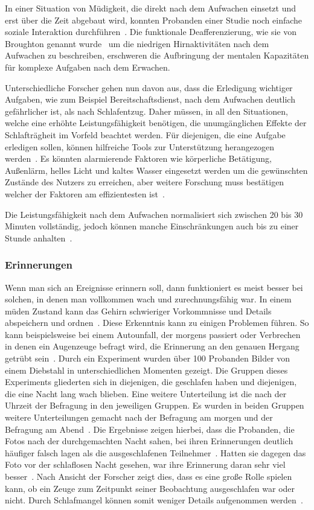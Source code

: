 In einer Situation von Müdigkeit, die direkt nach dem Aufwachen einsetzt und erst über die Zeit abgebaut wird, konnten Probanden einer Studie noch einfache soziale Interaktion durchführen~\cite{dinges1990you}. 
Die funktionale Deafferenzierung, wie sie von Broughton genannt wurde~\cite{broughton1968sleep} um die niedrigen Hirnaktivitäten nach dem Aufwachen zu beschreiben, erschweren die Aufbringung der mentalen Kapazitäten für komplexe Aufgaben nach dem Erwachen.

Unterschiedliche Forscher gehen nun davon aus, dass die Erledigung wichtiger Aufgaben, wie zum Beispiel Bereitschaftsdienst, nach dem Aufwachen deutlich gefährlicher ist, als nach Schlafentzug.
Daher müssen, in all den Situationen, welche eine erhöhte Leistungsfähigkeit benötigen, die unumgänglichen Effekte der Schlafträgheit im Vorfeld beachtet werden. 
Für diejenigen, die eine Aufgabe erledigen sollen, können hilfreiche Tools zur Unterstützung herangezogen werden~\cite{ferrara2000sleep}. 
Es könnten alarmierende Faktoren wie körperliche Betätigung, Außenlärm, helles Licht und kaltes Wasser eingesetzt werden um die gewünschten Zustände des Nutzers zu erreichen, aber weitere Forschung muss bestätigen welcher der Faktoren am effizientesten ist~\cite{ferrara2000sleep}.

Die Leistungsfähigkeit nach dem Aufwachen normalisiert sich zwischen 20 bis 30 Minuten vollständig, jedoch können manche Einschränkungen auch bis zu einer Stunde anhalten~\cite{online:muedesGehirn}.

\subsubsection{Erinnerungen}

Wenn man sich an Ereignisse erinnern soll, dann funktioniert es meist besser bei solchen, in denen man vollkommen wach und zurechnungsfähig war. In einem müden Zustand kann das Gehirn schwieriger Vorkommnisse und Details abspeichern und ordnen~\cite{online:streiche}. 
Diese Erkenntnis kann zu einigen Problemen führen. So kann beispielsweise bei einem Autounfall, der morgens passiert oder Verbrechen in denen ein Augenzeuge befragt wird, die Erinnerung an den genauen Hergang getrübt sein~\cite{online:streiche}. 
Durch ein Experiment wurden über 100 Probanden Bilder von einem Diebstahl in unterschiedlichen Momenten gezeigt. 
Die Gruppen dieses Experiments gliederten sich in diejenigen, die geschlafen haben und diejenigen, die eine Nacht lang wach blieben. Eine weitere Unterteilung ist die nach der Uhrzeit der Befragung in den jeweiligen Gruppen. Es wurden in beiden Gruppen weitere Unterteilungen gemacht nach der Befragung am morgen und der Befragung am Abend~\cite{online:streiche}. 
Die Ergebnisse zeigen hierbei, dass die Probanden, die Fotos nach der durchgemachten Nacht sahen, bei ihren Erinnerungen deutlich häufiger falsch lagen als die ausgeschlafenen Teilnehmer~\cite{online:streiche}.
Hatten sie dagegen das Foto vor der schlaflosen Nacht gesehen, war ihre Erinnerung daran sehr viel besser~\cite{online:streiche}. 
Nach Ansicht der Forscher zeigt dies, dass es eine große Rolle spielen kann, ob ein Zeuge zum Zeitpunkt seiner Beobachtung ausgeschlafen war oder nicht. Durch Schlafmangel können somit weniger Details aufgenommen werden~\cite{online:streiche}.
